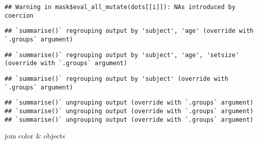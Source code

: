 \documentclass[
]{article}
\begin{document}
\begin{verbatim}
## Warning in mask$eval_all_mutate(dots[[i]]): NAs introduced by coercion
\end{verbatim}

\begin{verbatim}
## `summarise()` regrouping output by 'subject', 'age' (override with `.groups` argument)
\end{verbatim}

\begin{verbatim}
## `summarise()` regrouping output by 'subject', 'age', 'setsize' (override with `.groups` argument)
\end{verbatim}

\begin{verbatim}
## `summarise()` regrouping output by 'subject' (override with `.groups` argument)
\end{verbatim}

\begin{verbatim}
## `summarise()` ungrouping output (override with `.groups` argument)
## `summarise()` ungrouping output (override with `.groups` argument)
## `summarise()` ungrouping output (override with `.groups` argument)
\end{verbatim}

join color \& objects
\end{document}

